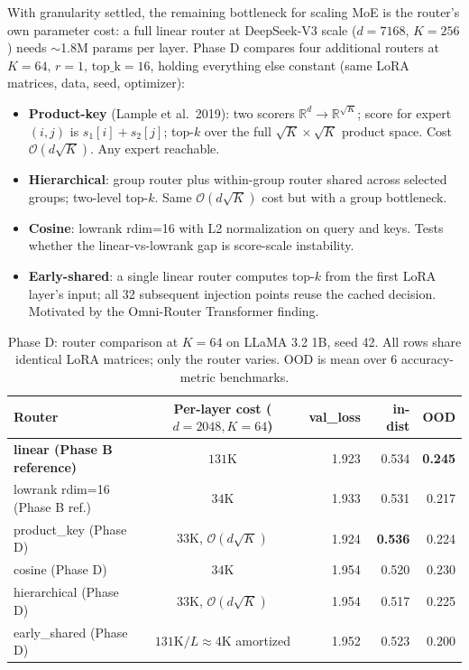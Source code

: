 \documentclass[10pt]{article}
\begin{document}
With granularity settled, the remaining bottleneck for scaling MoE is the router's own parameter cost: a full linear router at DeepSeek-V3 scale ($d{=}7168,\,K{=}256$) needs $\sim$1.8M params per layer. Phase D compares four additional routers at $K{=}64,\,r{=}1,\,\text{top\_k}{=}16$, holding everything else constant (same LoRA matrices, data, seed, optimizer):

\begin{itemize}\setlength\itemsep{0pt}
  \item \textbf{Product-key} (Lample et al.\ 2019): two scorers $\mathbb{R}^d \to \mathbb{R}^{\sqrt{K}}$; score for expert $(i,j)$ is $s_1[i] + s_2[j]$; top-$k$ over the full $\sqrt{K}\times\sqrt{K}$ product space. Cost $\mathcal{O}(d\sqrt{K})$. Any expert reachable.
  \item \textbf{Hierarchical}: group router plus within-group router shared across selected groups; two-level top-$k$. Same $\mathcal{O}(d\sqrt{K})$ cost but with a group bottleneck.
  \item \textbf{Cosine}: lowrank rdim=16 with L2 normalization on query and keys. Tests whether the linear-vs-lowrank gap is score-scale instability.
  \item \textbf{Early-shared}: a single linear router computes top-$k$ from the first LoRA layer's input; all 32 subsequent injection points reuse the cached decision. Motivated by the Omni-Router Transformer finding.
\end{itemize}

\begin{table}[h]
\centering\small
\begin{tabular}{@{}lcrrr@{}}
\toprule
Router & Per-layer cost ($d{=}2048, K{=}64$) & val\_loss & in-dist & OOD \\
\midrule
\textbf{linear (Phase B reference)} & $131$K                         & 1.923 & 0.534 & \textbf{0.245} \\
lowrank rdim=16 (Phase B ref.)      & $34$K                          & 1.933 & 0.531 & 0.217 \\
product\_key (Phase D)              & $33$K, $\mathcal{O}(d\sqrt{K})$ & 1.924 & \textbf{0.536} & 0.224 \\
cosine (Phase D)                    & $34$K                          & 1.954 & 0.520 & 0.230 \\
hierarchical (Phase D)              & $33$K, $\mathcal{O}(d\sqrt{K})$ & 1.954 & 0.517 & 0.225 \\
early\_shared (Phase D)             & $131\text{K} / L \approx 4$K amortized & 1.952 & 0.523 & 0.200 \\
\bottomrule
\end{tabular}
\caption{Phase D: router comparison at $K{=}64$ on LLaMA 3.2 1B, seed 42. All rows share identical LoRA matrices; only the router varies. OOD is mean over 6 accuracy-metric benchmarks.}
\label{tab:phased}
\end{table}
\end{document}
